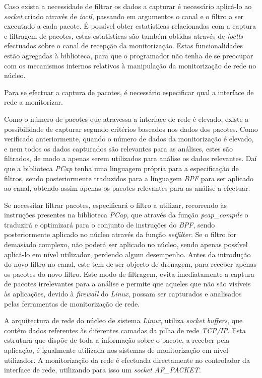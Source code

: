 Caso exista a necessidade de filtrar os dados a capturar é necessário aplicá-lo ao \textit{socket} criado através de \textit{ioctl}, passando em argumentos o canal e o filtro a ser executado a cada pacote.
É possível obter estatisticas relacionadas com a captura e filtragem de pacotes, estas estatisticas são também obtidas através de \textit{ioctls} efectuados sobre o canal de recepção da monitorização.
Estas funcionalidades estão agregadas à biblioteca, para que o programador não tenha de se preocupar com os mecanismos internos relativos à manipulação da monitorização de rede no núcleo.

Para se efectuar a captura de pacotes, é necessário especificar qual a interface de rede a monitorizar.

Como o número de pacotes que atravessa a interface de rede é elevado, existe a possibilidade de capturar segundo critérios baseados nos dados dos pacotes.
Como verificado anteriormente, quando o número de dados da monitorização é elevado, e nem todos os dados capturados são relevantes para as análises, estes são filtrados, de modo a apenas serem utilizados para análise os dados relevantes.
Daí que a biblioteca \textit{PCap} tenha uma linguagem própria para a especificação de filtros, sendo posteriormente traduzidos para a linguagem \textit{BPF} para ser aplicado ao canal, obtendo assim apenas os pacotes relevantes para as análise a efectuar.

Se necessitar filtrar pacotes, especificará o filtro a utilizar, recorrendo às instruções presentes na biblioteca \textit{PCap}, que através da função  \textit{pcap\_compile} o traduzirá e optimizará para o conjunto de instruções do \textit{BPF}, sendo posteriormente aplicado no núcleo através da função \textit{setfilter}.
Se o filtro for demasiado complexo, não poderá ser aplicado no núcleo, sendo apenas possível aplicá-lo em nível utilizador, perdendo algum desempenho.
Antes da introdução do novo filtro no canal, este tem de ser objecto de drenagem, para receber apenas os pacotes do novo filtro.
Este modo de filtragem, evita imediatamente a captura de pacotes irrelevantes para a análise e permite que aqueles que não são visíveis às aplicações, devido à \textit{firewall} do \textit{Linux}, possam ser capturados e analisados pelas ferramentas de monitorização de rede.

A arquitectura de rede do núcleo de sistema \textit{Linux}, utiliza \textit{socket buffers}, que contêm dados referentes às diferentes camadas da pilha de rede \textit{TCP/IP}.
Esta estrutura que dispõe de toda a informação sobre o pacote, a receber pela aplicação, é igualmente utilizada nos sistemas de monitorização em nível utilizador.
A monitorização da rede é efectuada directamente no controlador da interface de rede, utilizando para isso um \textit{socket} \textit{AF\_PACKET}.

